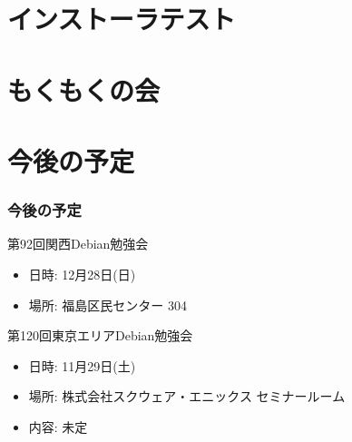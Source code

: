 \documentclass[cjk,dvipdfmx,10pt,compress,%
hyperref={bookmarks=true,bookmarksnumbered=true,bookmarksopen=false,%
colorlinks=false,%
pdftitle={第 91 回 関西 Debian 勉強会},%
pdfauthor={倉敷・のがた・佐々木・かわだ},%
pdfsubject={資料},%
}]{beamer}
\begin{document}



\section{インストーラテスト}

\section{もくもくの会}


\section{今後の予定}
\begin{frame}[fragile]
\frametitle{今後の予定}

\begin{block}{第92回関西Debian勉強会}
  \begin{itemize}
  \item 日時: 12月28日(日)
  \item 場所: 福島区民センター 304
  \end{itemize}
\end{block}

\begin{block}{第120回東京エリアDebian勉強会}
  \begin{itemize}
  \item 日時: 11月29日(土)
  \item 場所: 株式会社スクウェア・エニックス セミナールーム
  \item 内容: 未定
  \end{itemize}
\end{block}

\end{frame}

\takahashi[50]{  }
\end{document}
